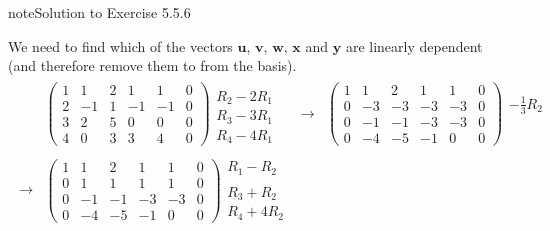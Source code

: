 \documentclass[letterpaper,10pt,english]{jupyterBook}
\begin{document}
\begin{sphinxadmonition}{note}{Solution to Exercise 5.5.6}



\sphinxAtStartPar
We need to find which of the vectors \(\mathbf{u}\), \(\mathbf{v}\), \(\mathbf{w}\), \(\mathbf{x}\) and \(\mathbf{y}\) are linearly dependent (and therefore remove them to from the basis).
\begin{equation*}
\begin{split} \begin{align*}
    & \left( \begin{array}{ccccc|c}
        1 & 1 & 2 & 1 & 1 & 0 \\
        2 & -1 & 1 & -1 & -1 & 0 \\
        3 & 2 & 5 & 0 & 0 & 0 \\
        4 & 0 & 3 & 3 & 4 & 0
    \end{array} \right)
    \begin{matrix} \\ R_2 - 2R_1 \\ R_3 - 3R_1 \\ R_4 - 4R_1 \end{matrix} &
    \longrightarrow &
    \left( \begin{array}{ccccc|c}
        1 & 1 & 2 & 1 & 1 & 0 \\
        0 & -3 & -3 & -3 & -3 & 0 \\
        0 & -1 & -1 & -3 & -3 & 0 \\
        0 & -4 & -5 & -1 & 0 & 0
    \end{array} \right)
    \begin{matrix} \\ -\frac{1}{3}R_2 \\ \phantom{x} \\ \phantom{x} \end{matrix} \\ \\
    \longrightarrow &
    \left( \begin{array}{ccccc|c}
        1 & 1 & 2 & 1 & 1 & 0 \\
        0 & 1 & 1 & 1 & 1 & 0 \\
        0 & -1 & -1 & -3 & -3 & 0 \\
        0 & -4 & -5 & -1 & 0 & 0
    \end{array} \right)
    \begin{matrix} R_1 - R_2 \\ \\ R_3 + R_2 \\ R_4 + 4R_2 \end{matrix} &

\end{align*}
\end{split}
\end{equation*}
\end{sphinxadmonition}
\end{document}
